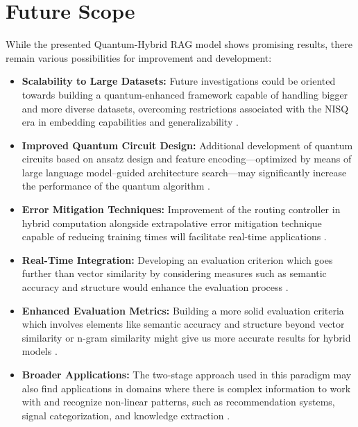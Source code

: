 \chapter*{Future Scope}
While the presented Quantum-Hybrid RAG model shows promising results, there remain various possibilities for improvement and development:

\begin{itemize}
	\item \textbf{Scalability to Large Datasets:} Future investigations could be oriented towards building a quantum-enhanced framework capable of handling bigger and more diverse datasets, overcoming restrictions associated with the NISQ era in embedding capabilities and generalizability \cite{vats2025quantumnlp}.
	
	\item \textbf{Improved Quantum Circuit Design:} Additional development of quantum circuits based on ansatz design and feature encoding—optimized by means of large language model–guided architecture search—may significantly increase the performance of the quantum algorithm \cite{llmqas2025}.
	
	\item \textbf{Error Mitigation Techniques:}  Improvement of the routing controller in hybrid computation alongside extrapolative error mitigation technique capable of reducing training times will facilitate real-time applications \cite{russo2024layerwise}.
	
	\item \textbf{Real-Time Integration:} Developing an evaluation criterion which goes further than vector similarity by considering measures such as semantic accuracy and structure would enhance the evaluation process \cite{extrapolative2026}.
	
	\item \textbf{Enhanced Evaluation Metrics:} Building a more solid evaluation criteria which involves elements like semantic accuracy and structure beyond vector similarity or n-gram similarity might give us more accurate results for hybrid models \cite{evalvariants2026}.
	
	\item \textbf{Broader Applications:} The two-stage approach used in this paradigm may also find applications in domains where there is complex information to work with and recognize non-linear patterns, such as recommendation systems, signal categorization, and knowledge extraction \cite{radar2025qml}.
\end{itemize}

